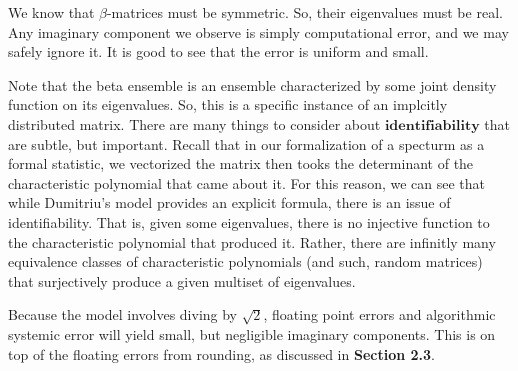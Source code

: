 We know that $\beta$-matrices must be symmetric. So, their eigenvalues must be real. Any imaginary component we observe is simply computational error, and we may safely ignore it.
It is good to see that the error is uniform and small.

\begin{remark}
Note that the beta ensemble is an ensemble characterized by some joint density function on its eigenvalues. So, this is a specific instance of an implcitly distributed matrix.
There are many things to consider about $\textbf{identifiability}$ that are subtle, but important.
Recall that in our formalization of a specturm as a formal statistic, we vectorized the matrix then tooks the determinant of the characteristic polynomial that came about it.
For this reason, we can see that while Dumitriu's model provides an explicit formula, there is an issue of identifiability.
That is, given some eigenvalues, there is no injective function to the characteristic polynomial that produced it.
Rather, there are infinitly many equivalence classes of characteristic polynomials (and such, random matrices) that surjectively produce a given multiset of eigenvalues.
\end{remark}

\begin{remark}
Because the model involves diving by $\sqrt{2}$, floating point errors and algorithmic systemic error will yield small, but negligible imaginary components.
This is on top of the floating errors from rounding, as discussed in \textbf{Section 2.3}.
\end{remark}

%
%
%

